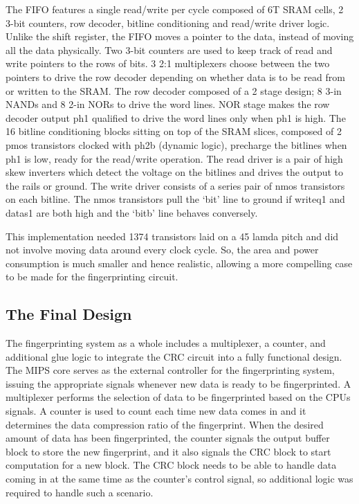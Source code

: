 \documentclass[10pt,journal,compsoc]{IEEEtran}
\begin{document}
The FIFO features a single read/write per cycle composed of 6T SRAM cells, 2 3-bit counters, row decoder, bitline conditioning and read/write driver logic. Unlike the shift register, the FIFO moves a pointer to the data, instead of moving all the data physically. Two 3-bit counters are used to keep track of read and write pointers to the rows of bits. 3 2:1 multiplexers choose between the two pointers to drive the row decoder depending on whether data is to be read from or written to the SRAM. The row decoder composed of a 2 stage design; 8 3-in NANDs and 8 2-in NORs to drive the word lines. NOR stage makes the row decoder output ph1 qualified to drive the word lines only when ph1 is high. The 16 bitline conditioning blocks sitting on top of the SRAM slices, composed of 2 pmos transistors clocked with ph2b (dynamic logic), precharge the bitlines when ph1 is low, ready for the read/write operation. The read driver is a pair of high skew inverters which detect the voltage on the bitlines and drives the output to the rails or ground. The write driver consists of a series pair of nmos transistors on each bitline. The nmos transistors pull the ‘bit’ line to ground if writeq1 and datas1 are both high and the ‘bitb’ line behaves conversely.  

This implementation needed 1374 transistors laid on a 45 lamda pitch and did not involve moving data around every clock cycle. So, the area and power consumption is much smaller and hence realistic, allowing a more compelling case to be made for the fingerprinting circuit. 


\subsection{The Final Design}
The fingerprinting system as a whole includes a multiplexer, a counter, and additional glue logic to integrate the CRC circuit into a fully functional design. The MIPS core serves as the external controller for the fingerprinting system, issuing the appropriate signals whenever new data is ready to be fingerprinted. A multiplexer performs the selection of data to be fingerprinted based on the CPUs signals. A counter is used to count each time new data comes in and it determines the data compression ratio of the fingerprint. When the desired amount of data has been fingerprinted, the counter signals the output buffer block to store the new fingerprint, and it also signals the CRC block to start computation for a new block. The CRC block needs to be able to handle data coming in at the same time as the counter's control signal, so additional logic was required to handle such a scenario. 
\end{document}
